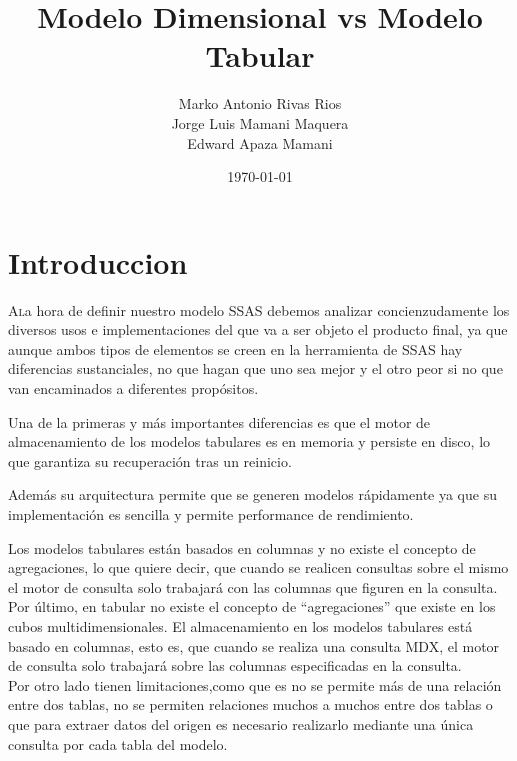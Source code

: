 \documentclass[twoside,twocolumn]{article}
\title{Modelo Dimensional vs Modelo Tabular}
\author{Marko Antonio Rivas Rios\\  Jorge Luis Mamani Maquera\\ Edward Apaza Mamani
}
\date{\today}
\begin{document}
\maketitle


\section{Introduccion}
\lettrine[nindent=0em,lines=3]{A} la hora de definir nuestro modelo SSAS debemos analizar concienzudamente los diversos usos e implementaciones del que va a ser objeto el producto final, ya que aunque ambos tipos de elementos se creen en la herramienta de SSAS hay diferencias sustanciales, no que hagan que uno sea mejor y el otro peor si no que van encaminados a diferentes propósitos.

Una de la primeras y más importantes diferencias es que el motor de almacenamiento de los modelos tabulares es en memoria y persiste en disco, lo que garantiza su recuperación tras un reinicio.

Además su arquitectura permite que se generen modelos rápidamente ya que su implementación es sencilla y permite performance de rendimiento.

Los modelos tabulares están basados en columnas y no existe el concepto de agregaciones, lo que quiere decir, que cuando se realicen consultas sobre el mismo el motor de consulta solo trabajará con las columnas que figuren en la consulta.\textbf{}\\
Por último, en tabular no existe el concepto de “agregaciones” que existe en los cubos multidimensionales. El almacenamiento en los modelos tabulares está basado en columnas, esto es, que cuando se realiza una consulta MDX, el motor de consulta solo trabajará sobre las columnas especificadas en la consulta.
\textbf{}\\
Por otro lado tienen limitaciones,como que es no se permite más de una relación entre dos tablas, no se permiten relaciones muchos a muchos entre dos tablas o que para extraer datos del origen es necesario realizarlo mediante una única consulta por cada tabla del modelo.




\end{document}
